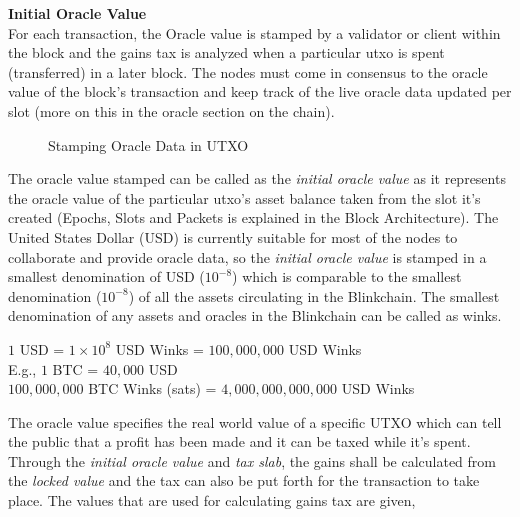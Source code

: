 \documentclass[letterpaper,11pt]{article}
\begin{document}
\textbf{Initial Oracle Value}\\


For each transaction, the Oracle value is stamped by a validator or client within the block and the gains tax is analyzed when a particular utxo is spent (transferred) in a later block. The nodes must come in consensus to the oracle value of the block's transaction and keep track of the live oracle data updated per slot (more on this in the  oracle section on the chain).\\


\begin{figure}
\caption{Stamping Oracle Data in UTXO}
\end{figure} 

The oracle value stamped can be called as the \textit{initial oracle value} as it represents the oracle value of the particular utxo's asset balance taken from the slot it's created (Epochs, Slots and Packets is explained in the Block Architecture). The United States Dollar (USD) is currently suitable for most of the nodes to collaborate and provide oracle data, so the \textit{initial oracle value} is stamped in a smallest denomination of USD ($10^{-8}$) which is comparable to the smallest denomination ($10^{-8}$) of all the assets circulating in the Blinkchain. The smallest denomination of any assets and oracles in the Blinkchain can be called as winks.\\

\begin{center}
$1$ USD = $1 \times 10^{8}$ USD Winks = $100,000,000$ USD Winks\\
\vspace{2mm}
E.g., $1$ BTC = $40,000$ USD\\
$100,000,000$ BTC Winks (sats) = $4,000,000,000,000$ USD Winks
\end{center}

The oracle value specifies the real world value of a specific UTXO which can tell the public that a profit has been made and it can be taxed while it's spent. Through the \textit{initial oracle value} and \textit{tax slab}, the gains shall be calculated from the \textit{locked value} and the tax can also be put forth for the transaction to take place. The values that are used for calculating gains tax are given,\\
\end{document}
